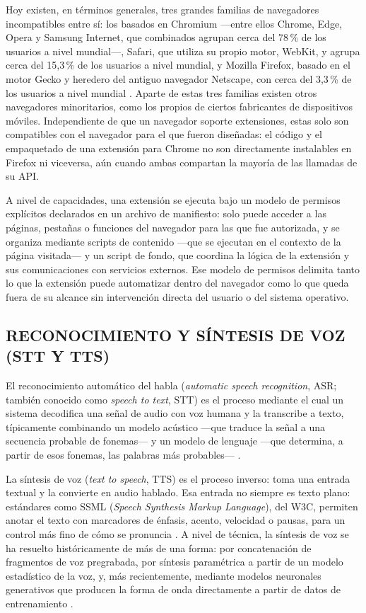 Hoy existen, en términos generales, tres grandes familias de navegadores incompatibles entre sí: los basados en Chromium —entre ellos Chrome, Edge, Opera y Samsung Internet, que combinados agrupan cerca del 78\,\% de los usuarios a nivel mundial—, Safari, que utiliza su propio motor, WebKit, y agrupa cerca del 15,3\,\% de los usuarios a nivel mundial, y Mozilla Firefox, basado en el motor Gecko y heredero del antiguo navegador Netscape, con cerca del 3,3\,\% de los usuarios a nivel mundial \cite{statcounter2026browsershare}. Aparte de estas tres familias existen otros navegadores minoritarios, como los propios de ciertos fabricantes de dispositivos móviles. Independiente de que un navegador soporte extensiones, estas solo son compatibles con el navegador para el que fueron diseñadas: el código y el empaquetado de una extensión para Chrome no son directamente instalables en Firefox ni viceversa, aún cuando ambas compartan la mayoría de las llamadas de su API.

A nivel de capacidades, una extensión se ejecuta bajo un modelo de permisos explícitos declarados en un archivo de manifiesto: solo puede acceder a las páginas, pestañas o funciones del navegador para las que fue autorizada, y se organiza mediante scripts de contenido —que se ejecutan en el contexto de la página visitada— y un script de fondo, que coordina la lógica de la extensión y sus comunicaciones con servicios externos. Ese modelo de permisos delimita tanto lo que la extensión puede automatizar dentro del navegador como lo que queda fuera de su alcance sin intervención directa del usuario o del sistema operativo.

\subsection{RECONOCIMIENTO Y SÍNTESIS DE VOZ (STT Y TTS)}

El reconocimiento automático del habla (\textit{automatic speech recognition}, ASR; también conocido como \textit{speech to text}, STT) es el proceso mediante el cual un sistema decodifica una señal de audio con voz humana y la transcribe a texto, típicamente combinando un modelo acústico —que traduce la señal a una secuencia probable de fonemas— y un modelo de lenguaje —que determina, a partir de esos fonemas, las palabras más probables— \cite{ibmasr}.

La síntesis de voz (\textit{text to speech}, TTS) es el proceso inverso: toma una entrada textual y la convierte en audio hablado. Esa entrada no siempre es texto plano: estándares como SSML (\textit{Speech Synthesis Markup Language}), del W3C, permiten anotar el texto con marcadores de énfasis, acento, velocidad o pausas, para un control más fino de cómo se pronuncia \cite{w3cssml}. A nivel de técnica, la síntesis de voz se ha resuelto históricamente de más de una forma: por concatenación de fragmentos de voz pregrabada, por síntesis paramétrica a partir de un modelo estadístico de la voz, y, más recientemente, mediante modelos neuronales generativos que producen la forma de onda directamente a partir de datos de entrenamiento \cite{tan2021neuraltts}.

